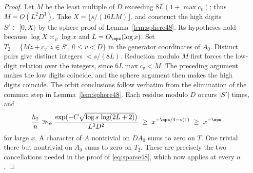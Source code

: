 \documentclass[a4paper,11pt]{article}
\theoremstyle{definition}
\theoremstyle{remark}
\numberwithin{equation}{section}
\begin{document}
\begin{proof}
Let \(M\) be the least multiple of \(D\) exceeding \(8L(1+\max c_v)\);
thus \(M=O(L^2D^3)\). Take \(X=\lfloor s/(16LM)\rfloor\), and construct
the high digits \(S'\subset[0,X)\) by the sphere proof of
Lemma~\ref{lem:sphere48}. Its hypotheses hold because
\(\log X\asymp_\psi\log x\) and \(L=O_\eps(\log x)\).
Set \(T_2=\{Mz+c_v:z\in S',\,0\le v<D\}\) in the generator coordinates
of \(A_0\). Distinct pairs give distinct integers \(<s/(8L)\).
Reduction modulo \(M\) first forces the low-digit relation over
the integers, since \(6L\max c_v<M\). The preceding argument makes
the low digits coincide, and the sphere argument then makes the
high digits coincide. The orbit conclusions follow verbatim from
the elimination of the common step in Lemma~\ref{lem:sphere48}.
Each residue modulo \(D\) occurs \(|S'|\) times, and
\[
 \frac{h_2}{n}\gg_\psi
    \frac{\exp(-C\sqrt{\log s\,\log(2L+2)})}{L^3D^2}
    \ \ge\ x^{-\eps/4-o(1)}\ \ge\ x^{-\eps}
\]
for large \(x\). A character of \(A\) nontrivial on \(DA_0\) sums to
zero on \(T\). One trivial there but nontrivial on \(A_0\) sums to
zero on \(T_2\). These are precisely the two cancellations needed
in the proof of \eqref{eq:sparse48}, which now applies at every \(u\).
\end{proof}
\end{document}
